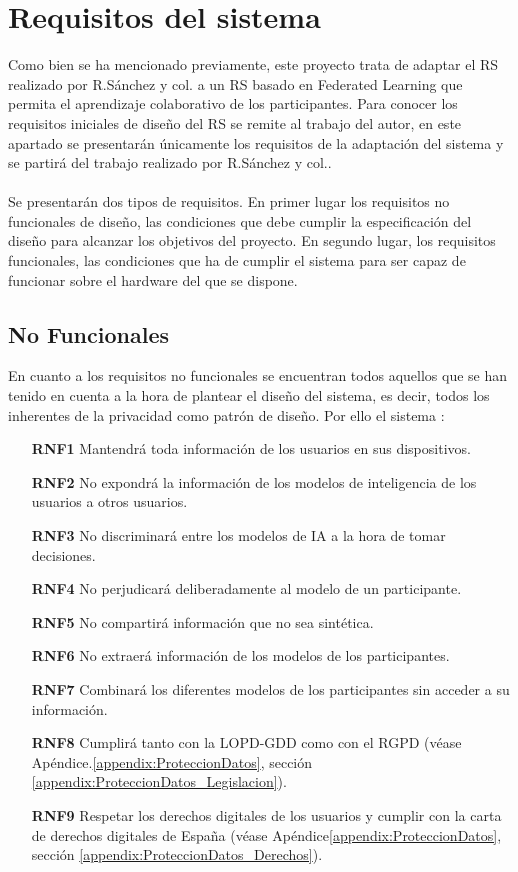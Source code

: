 \section{Requisitos del sistema}
Como bien se ha mencionado previamente, este proyecto trata de adaptar el RS realizado por R.Sánchez y col.\autocite{sanchez-corcueraPersuasionbasedRecommenderSystem2020} a un RS basado en Federated Learning que permita el aprendizaje colaborativo de los participantes. Para conocer los requisitos iniciales de diseño del RS se remite al trabajo del autor, en este apartado se presentarán únicamente los requisitos de la adaptación del sistema y se partirá del trabajo realizado por R.Sánchez y col.. 
\\ \\
Se presentarán dos tipos de requisitos. En primer lugar los requisitos no funcionales de diseño, las condiciones que debe cumplir la especificación del diseño para alcanzar los objetivos del proyecto. En segundo lugar, los requisitos funcionales, las condiciones que ha de cumplir el sistema para ser capaz de funcionar sobre el hardware del que se dispone.

\subsection{No Funcionales}
En cuanto a los requisitos no funcionales se encuentran todos aquellos que se han tenido en cuenta a la hora de plantear el diseño del sistema, es decir, todos los inherentes de la privacidad como patrón de diseño. Por ello el sistema :
\begin{itemize}
    \item [\textbf{RNF1}] Mantendrá toda información de los usuarios en sus dispositivos.
    \item [\textbf{RNF2}] No expondrá la información de los modelos de inteligencia de los usuarios a otros usuarios.
    \item [\textbf{RNF3}] No discriminará entre los modelos de IA a la hora de tomar decisiones.
    \item [\textbf{RNF4}] No perjudicará deliberadamente al modelo de un participante.
    \item [\textbf{RNF5}] No compartirá información que no sea sintética.
    \item [\textbf{RNF6}] No extraerá información de los modelos de los participantes.
    \item [\textbf{RNF7}] Combinará los diferentes modelos de los participantes sin acceder a su información.
    \item [\textbf{RNF8}] Cumplirá tanto con la LOPD-GDD como con el RGPD (véase Apéndice.\ref{appendix:ProteccionDatos}, sección \ref{appendix:ProteccionDatos_Legislacion}).
    \item [\textbf{RNF9}] Respetar los derechos digitales de los usuarios y cumplir con la carta de derechos digitales de España (véase Apéndice\ref{appendix:ProteccionDatos}, sección \ref{appendix:ProteccionDatos_Derechos}).
\end{itemize}
